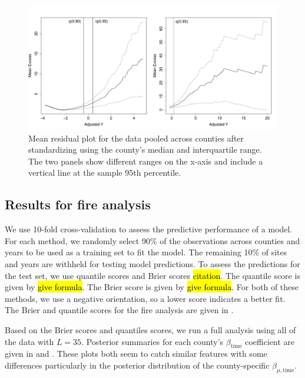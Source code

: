 \documentclass[11pt]{article}
\begin{document}
\begin{figure}[htbp]
  \centering
  \includegraphics[width = \linewidth]{plots/fire-mrl-plots.pdf}  %
  \caption{Mean residual plot for the data pooled across counties after standardizing using the county's median and interquartile range. The two panels show different ranges on the x-axis and include a vertical line at the sample 95th percentile.}
  \label{ebfig:mrlthresh}
\end{figure}


\subsection{Results for fire analysis}\label{ebs:results-fire}
We use 10-fold cross-validation to assess the predictive performance of a model.
For each method, we randomly select 90\% of the observations across counties and years to be used as a training set to fit the model.
The remaining 10\% of sites and years are withheld for testing model predictions.
To assess the predictions for the test set, we use quantile scores and Brier scores \hl{citation}.
The quantile score is given by \hl{give formula}.
The Brier score is given by \hl{give formula}.
For both of these methods, we use a negative orientation, so a lower score indicates a better fit.
The Brier and quantile scores for the fire analysis are given in .

Based on the Brier scores and quantiles scores, we run a full analysis using all of the data with $L = 35$.
Posterior summaries for each county's $\beta_\text{time}$ coefficient are given in  and .
These plots both seem to catch similar features with some differences particularly in the posterior distribution of the county-specific $\beta_{\mu, \text{time}}$.
\end{document}
